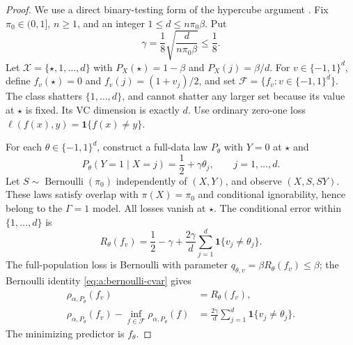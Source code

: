 \begin{proof}
We use a direct binary-testing form of the hypercube argument
\cite{yu1997assouad}. Fix
$\pi_0\in(0,1]$, $n\geq1$, and an integer
$1\leq d\leq n\pi_0\beta$.
Put
\begin{equation}
 \gamma=\frac18\sqrt{\frac{d}{n\pi_0\beta}}\leq\frac18.
 \label{eq:b:lower-gamma}
\end{equation}
Let $\mathcal X=\{\star,1,\ldots,d\}$ with
$P_X(\star)=1-\beta$ and $P_X(j)=\beta/d$.
For $v\in\{-1,1\}^d$, define
$f_v(\star)=0$ and $f_v(j)=(1+v_j)/2$, and set
$\mathcal F=\{f_v:v\in\{-1,1\}^d\}$.
The class shatters $\{1,\ldots,d\}$, and cannot shatter any larger set
because its value at $\star$ is fixed. Its VC dimension is exactly $d$.
Use ordinary zero-one loss $\ell(f(x),y)=\mathbf1\{f(x)\ne y\}$.

For each $\theta\in\{-1,1\}^d$, construct a full-data law $P_\theta$
with $Y=0$ at $\star$ and
\[
 P_\theta(Y=1\mid X=j)=\frac12+\gamma\theta_j,
 \qquad j=1,\ldots,d.
\]
Let $S\sim\operatorname{Bernoulli}(\pi_0)$ independently of $(X,Y)$,
and observe $(X,S,SY)$. These laws satisfy overlap with
$\pi(X)=\pi_0$ and conditional ignorability, hence belong to the
$\Gamma=1$ model.
All losses vanish at $\star$. The conditional error within
$\{1,\ldots,d\}$ is
\begin{equation}
 R_\theta(f_v)=\frac12-\gamma+
 \frac{2\gamma}{d}\sum_{j=1}^d\mathbf1\{v_j\ne\theta_j\}.
 \label{eq:b:hypercube-risk}
\end{equation}
The full-population loss is Bernoulli with parameter
$q_{\theta,v}=\beta R_\theta(f_v)\leq\beta$; the Bernoulli identity
\eqref{eq:a:bernoulli-cvar} gives
\begin{equation}
 \begin{split}
 \rho_{\alpha,P_\theta}(f_v)&=R_\theta(f_v),\\
 \rho_{\alpha,P_\theta}(f_v)-\inf_{f\in\mathcal F}
 \rho_{\alpha,P_\theta}(f)
 &=\frac{2\gamma}{d}\sum_{j=1}^d\mathbf1\{v_j\ne\theta_j\}.
 \end{split}
 \label{eq:b:CVaR-hamming}
\end{equation}
The minimizing predictor is $f_\theta$.


\end{proof}
